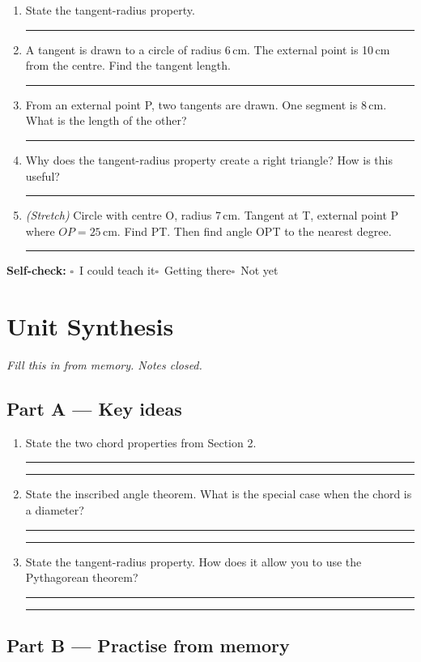\documentclass[11pt, a4paper]{article}
\newcommand{\answerline}{\par\vspace{0.45cm}\noindent\rule{\linewidth}{0.4pt}\par\vspace{0.1cm}}
\newcommand{\selfcheck}{\par\smallskip\noindent\textbf{Self-check:}
  $\square$~I could teach it\quad$\square$~Getting there\quad$\square$~Not yet\smallskip}
\begin{document}
\begin{tcolorbox}[retrieval]
\begin{enumerate}[leftmargin=*, itemsep=10pt]
  \item State the tangent-radius property. \answerline
  \item A tangent is drawn to a circle of radius 6\,cm. The external point is 10\,cm from the centre. Find the tangent length. \answerline
  \item From an external point P, two tangents are drawn. One segment is 8\,cm. What is the length of the other? \answerline
  \item Why does the tangent-radius property create a right triangle? How is this useful? \answerline
  \item \textit{(Stretch)} Circle with centre O, radius 7\,cm. Tangent at T, external point P where $OP = 25$\,cm. Find PT. Then find angle OPT to the nearest degree. \answerline
\end{enumerate}
\selfcheck
\end{tcolorbox}

\clearpage

\section*{Unit Synthesis}

\textit{Fill this in from memory. Notes closed.}

\subsection*{Part A --- Key ideas}

\begin{enumerate}[leftmargin=*, itemsep=10pt]
  \item State the two chord properties from Section 2.
  \answerline\answerline
  \item State the inscribed angle theorem. What is the special case when the chord is a diameter?
  \answerline\answerline
  \item State the tangent-radius property. How does it allow you to use the Pythagorean theorem?
  \answerline\answerline
\end{enumerate}

\subsection*{Part B --- Practise from memory}
\end{document}
